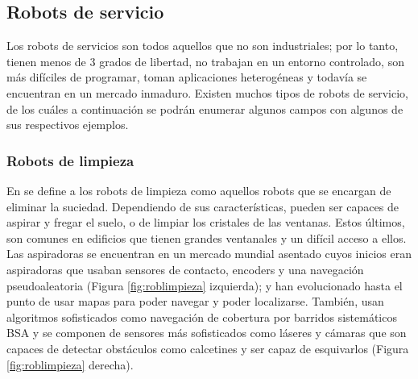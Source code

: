 


\setcounter{footnote}{2} %


\subsection{Robots de servicio}

Los robots de servicios son todos aquellos que no son industriales; por lo tanto, tienen menos de 3 grados de libertad, no trabajan en un entorno controlado, son más difíciles de programar, toman aplicaciones heterogéneas y todavía se encuentran en un mercado inmaduro. Existen muchos tipos de robots de servicio, de los cuáles a continuación se podrán enumerar algunos campos con algunos de sus respectivos ejemplos. \\ 


\subsubsection{Robots de limpieza}

En \cite{plaza_robotica_servicio} se define a los robots de limpieza como aquellos robots que se encargan de eliminar la suciedad. Dependiendo de sus características, pueden ser capaces de aspirar y fregar el suelo, o de limpiar los cristales de las ventanas. Estos últimos, son comunes en edificios que tienen grandes ventanales y un difícil acceso a ellos. Las aspiradoras se encuentran en un mercado mundial asentado cuyos inicios eran aspiradoras que usaban sensores de contacto, encoders y una navegación pseudoaleatoria (Figura \ref{fig:roblimpieza} izquierda); y han evolucionado hasta el punto de usar mapas para poder navegar y poder localizarse. También, usan algoritmos sofisticados como navegación de cobertura por barridos sistemáticos \acs{BSA} y se componen de sensores más sofisticados como láseres y cámaras que son capaces de detectar obstáculos como calcetines y ser capaz de esquivarlos (Figura \ref{fig:roblimpieza} derecha).\\



